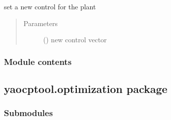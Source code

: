 \documentclass[letterpaper,10pt,english]{sphinxmanual}
\begin{document}
\begin{fulllineitems}
\begin{fulllineitems}
\begin{quote}
\begin{description}
\end{description}\end{quote}

\end{fulllineitems}


\begin{fulllineitems}
\label{\detokenize{yaocptool.mpc:yaocptool.mpc.plant.PlantSimulation.n_x}}
\end{fulllineitems}


\begin{fulllineitems}
\label{\detokenize{yaocptool.mpc:yaocptool.mpc.plant.PlantSimulation.set_control}}
set a new control for the plant
\begin{quote}\begin{description}
\item[{Parameters}] \leavevmode
{} () \textendash{} new control vector

\end{description}\end{quote}

\end{fulllineitems}


\end{fulllineitems}



\subsubsection{Module contents}
\label{\detokenize{yaocptool.mpc:module-yaocptool.mpc}}\label{\detokenize{yaocptool.mpc:module-contents}}

\subsection{yaocptool.optimization package}
\label{\detokenize{yaocptool.optimization:yaocptool-optimization-package}}\label{\detokenize{yaocptool.optimization::doc}}

\subsubsection{Submodules}
\label{\detokenize{yaocptool.optimization:submodules}}
\end{document}
